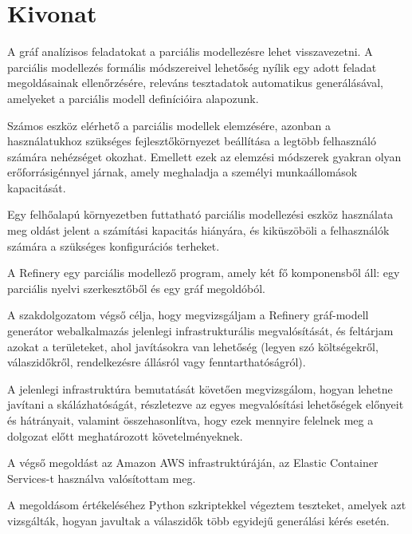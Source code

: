 \setcounter{page}{1}

\selecthungarian

\chapter*{Kivonat}
	A gráf analízisos feladatokat a parciális modellezésre lehet visszavezetni. 
	A parciális modellezés formális módszereivel lehetőség nyílik egy adott feladat megoldásainak ellenőrzésére, releváns tesztadatok automatikus generálásával, amelyeket a parciális modell definícióira alapozunk.

	Számos eszköz elérhető a parciális modellek elemzésére, azonban a használatukhoz szükséges fejlesztőkörnyezet beállítása a legtöbb felhasználó számára nehézséget okozhat. Emellett ezek az elemzési módszerek gyakran olyan erőforrásigénnyel járnak, amely meghaladja a személyi munkaállomások kapacitását.	

	Egy felhőalapú környezetben futtatható parciális modellezési eszköz használata meg
	oldást jelent a számítási kapacitás hiányára, és kiküszöböli a felhasználók számára a
 	szükséges konfigurációs terheket.

	A Refinery egy parciális modellező program, amely két fő komponensből áll: egy parciális
	nyelvi szerkesztőből és egy gráf megoldóból.

	A szakdolgozatom végső célja, hogy megvizsgáljam a Refinery gráf-modell generátor webalkalmazás jelenlegi infrastrukturális megvalósítását, és feltárjam azokat a területeket, ahol javításokra van lehetőség (legyen szó költségekről, válaszidőkről, rendelkezésre állásról vagy fenntarthatóságról).

	A jelenlegi infrastruktúra bemutatását követően megvizsgálom, hogyan lehetne javítani a skálázhatóságát,
	 részletezve az egyes megvalósítási lehetőségek előnyeit és hátrányait, 
	 valamint összehasonlítva, hogy ezek mennyire felelnek meg a dolgozat előtt meghatározott követelményeknek.

	A végső megoldást az Amazon AWS infrastruktúráján, az Elastic Container Services-t használva 
	valósítottam meg.

	A megoldásom értékeléséhez Python szkriptekkel végeztem teszteket, 
	amelyek azt vizsgálták, hogyan javultak a válaszidők több egyidejű generálási kérés esetén.


